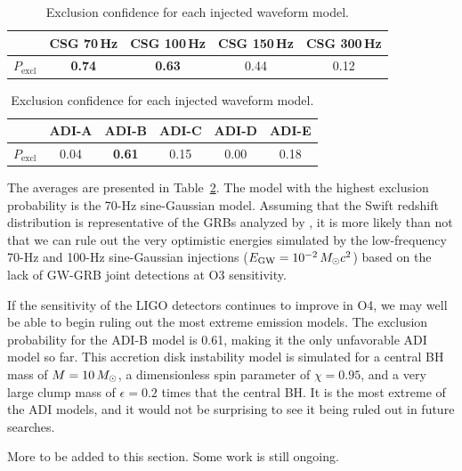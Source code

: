 \begin{table}[h]
  \hspace{0.5cm}
  \caption
  {\label{tab:grb-o3b-model-exclusion} Exclusion confidence for each injected waveform model.}
  \begin{tabular}{c c c c c}
    \hline
    \hline
    \rule{0pt}{4ex}
    & CSG 70\,Hz & CSG 100\,Hz & CSG 150\,Hz & CSG 300\,Hz \\
    \hline
    \rule[-2ex]{0pt}{4ex}
		$P_{\text{excl}}$ & \textbf{0.74} & \textbf{0.63} & 0.44 & 0.12
  \end{tabular}
  \begin{tabular}{c c c c c c}
    \hline
    \hline
    \rule{0pt}{4ex}
    & ADI-A & ADI-B & ADI-C & ADI-D & ADI-E \\
    \hline
    \rule[-2ex]{0pt}{4ex}
    $P_{\text{excl}}$ & 0.04 & \textbf{0.61} & 0.15 & 0.00 & 0.18 \\
    \hline
  \end{tabular}
\end{table}

The averages are presented in Table~\ref{tab:grb-o3b-model-exclusion}.
The model with the highest exclusion probability is the 70-Hz sine-Gaussian model.
Assuming that the Swift redshift distribution is representative of the GRBs analyzed by \xpip, it is more likely than not that we can rule out the very optimistic energies simulated by the low-frequency 70-Hz and 100-Hz sine-Gaussian injections ($E_{\text{GW}} = 10^{-2}\,M_{\odot} c^2$) based on the lack of GW-GRB joint detections at O3 sensitivity.

If the sensitivity of the LIGO detectors continues to improve in \ac{O4}, we may well be able to begin ruling out the most extreme emission models.
The exclusion probability for the ADI-B model is 0.61, making it the only unfavorable ADI model so far.
This accretion disk instability model is simulated for a central \ac{BH} mass of $M=10\,M_{\odot}$, a dimensionless spin parameter of $\chi=0.95$, and a very large clump mass of $\epsilon=0.2$ times that the central \ac{BH}.
It is the most extreme of the ADI models, and it would not be surprising to see it being ruled out in future searches.

{\color{red}More to be added to this section. Some work is still ongoing.}
